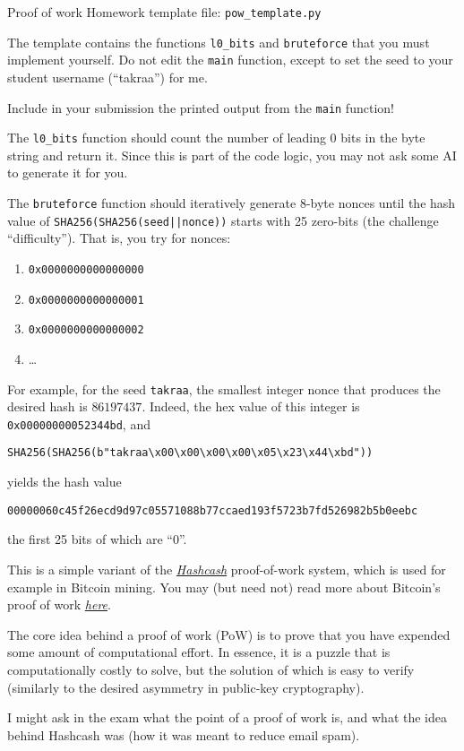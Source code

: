 \documentclass{homework}
\begin{document}
\newpage

\begin{task}{Proof of work}
  Homework template file: \texttt{pow\_template.py}

  The template contains the functions \texttt{l0\_bits} and \texttt{bruteforce} that you must implement yourself.
  Do not edit the \texttt{main} function, except to set the seed to your student username (\enquote{takraa}) for me.

  Include in your submission the printed output from the \texttt{main} function!

  The \texttt{l0\_bits} function should count the number of leading 0 bits in the byte string and return it.
  Since this is part of the code logic, you may not ask some AI to generate it for you.

  The \texttt{bruteforce} function should iteratively generate 8-byte nonces until the hash value of \texttt{SHA256(SHA256(seed||nonce))}
  starts with 25 zero-bits (the challenge \enquote{difficulty}). That is, you try for nonces:
  \begin{enumerate}
    \item \texttt{0x0000000000000000}
    \item \texttt{0x0000000000000001}
    \item \texttt{0x0000000000000002}
    \item \dots
  \end{enumerate}

  For example, for the seed \texttt{takraa}, the smallest integer nonce that produces the desired hash is $86197437$.
  Indeed, the hex value of this integer is \texttt{0x00000000052344bd}, and
   \begin{Verbatim}
SHA256(SHA256(b"takraa\x00\x00\x00\x00\x05\x23\x44\xbd"))
  \end{Verbatim}
  yields the hash value
  \begin{Verbatim}
00000060c45f26ecd9d97c05571088b77ccaed193f5723b7fd526982b5b0eebc
  \end{Verbatim}
  the first 25 bits of which are \enquote{0}.
\end{task}

This is a simple variant of the \href{https://en.wikipedia.org/wiki/Hashcash}{\textit{Hashcash}} proof-of-work system, which is used for example in Bitcoin mining.
You may (but need not) read more about Bitcoin's proof of work \href{https://en.bitcoin.it/wiki/Proof_of_work}{\textit{here}}.

The core idea behind a proof of work (PoW) is to prove that you have expended some amount of computational effort.
In essence, it is a puzzle that is computationally costly to solve, but the solution of which is easy to verify (similarly to the desired asymmetry in public-key cryptography).

I might ask in the exam what the point of a proof of work is, and what the idea behind Hashcash was (how it was meant to reduce email spam).
\end{document}

